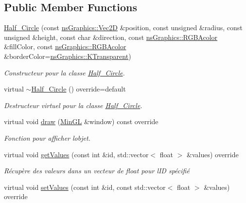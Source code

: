 \subsection*{Public Member Functions}
\begin{DoxyCompactItemize}
\item 
\hyperlink{classhalf__circle_1_1_half___circle_a4745acf1a6bd730b7272d3deb1d45a10}{Half\+\_\+\+Circle} (const \hyperlink{classns_graphics_1_1_vec2_d}{ns\+Graphics\+::\+Vec2D} \&position, const unsigned \&radius, const unsigned \&height, const char \&direction, const \hyperlink{classns_graphics_1_1_r_g_b_acolor}{ns\+Graphics\+::\+R\+G\+B\+Acolor} \&fill\+Color, const \hyperlink{classns_graphics_1_1_r_g_b_acolor}{ns\+Graphics\+::\+R\+G\+B\+Acolor} \&border\+Color=\hyperlink{namespacens_graphics_ab2001ad03cceb2565849e04465618c1e}{ns\+Graphics\+::\+K\+Transparent})
\begin{DoxyCompactList}\small\item\em Constructeur pour la classe \hyperlink{classhalf__circle_1_1_half___circle}{Half\+\_\+\+Circle}. \end{DoxyCompactList}\item 
virtual \hyperlink{classhalf__circle_1_1_half___circle_a72930c6bddc0f5bb504759a189bb7409}{$\sim$\+Half\+\_\+\+Circle} () override=default
\begin{DoxyCompactList}\small\item\em Destructeur virtuel pour la classe \hyperlink{classhalf__circle_1_1_half___circle}{Half\+\_\+\+Circle}. \end{DoxyCompactList}\item 
virtual void \hyperlink{classhalf__circle_1_1_half___circle_a46b2ea1d78fcacdf2b79707c6431774b}{draw} (\hyperlink{class_min_g_l}{Min\+GL} \&window) const override
\begin{DoxyCompactList}\small\item\em Fonction pour afficher l\textquotesingle{}objet. \end{DoxyCompactList}\item 
virtual void \hyperlink{classhalf__circle_1_1_half___circle_a32fbc3cf8c53b5a239c56b0be6df3e7e}{get\+Values} (const int \&id, std\+::vector$<$ float $>$ \&values) override
\begin{DoxyCompactList}\small\item\em Récupère des valeurs dans un vecteur de float pour l\textquotesingle{}ID spécifié \end{DoxyCompactList}\item 
virtual void \hyperlink{classhalf__circle_1_1_half___circle_ab128d56c2d348524d88da23b89bf3d35}{set\+Values} (const int \&id, const std\+::vector$<$ float $>$ \&values) override

\end{DoxyCompactItemize}
